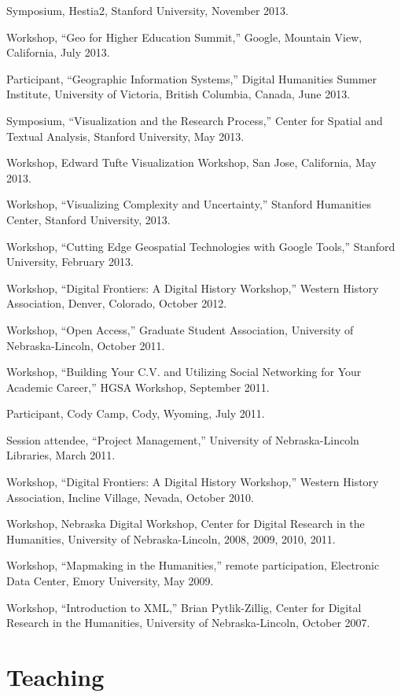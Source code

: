Symposium, Hestia2, Stanford University, November 2013.

Workshop, ``Geo for Higher Education Summit,'' Google, Mountain View,
California, July 2013.

Participant, ``Geographic Information Systems,'' Digital Humanities
Summer Institute, University of Victoria, British Columbia, Canada, June
2013.

Symposium, ``Visualization and the Research Process,'' Center for
Spatial and Textual Analysis, Stanford University, May 2013.

Workshop, Edward Tufte Visualization Workshop, San Jose, California, May
2013.

Workshop, ``Visualizing Complexity and Uncertainty,'' Stanford
Humanities Center, Stanford University, 2013.

Workshop, ``Cutting Edge Geospatial Technologies with Google Tools,''
Stanford University, February 2013.

Workshop, ``Digital Frontiers: A Digital History Workshop,'' Western
History Association, Denver, Colorado, October 2012.

Workshop, ``Open Access,'' Graduate Student Association, University of
Nebraska-Lincoln, October 2011.

Workshop, ``Building Your C.V. and Utilizing Social Networking for Your
Academic Career,'' HGSA Workshop, September 2011.

Participant, Cody Camp, Cody, Wyoming, July 2011.

Session attendee, ``Project Management,'' University of Nebraska-Lincoln
Libraries, March 2011.

Workshop, ``Digital Frontiers: A Digital History Workshop,'' Western
History Association, Incline Village, Nevada, October 2010.

Workshop, Nebraska Digital Workshop, Center for Digital Research in the
Humanities, University of Nebraska-Lincoln, 2008, 2009, 2010, 2011.

Workshop, ``Mapmaking in the Humanities,'' remote participation,
Electronic Data Center, Emory University, May 2009.

Workshop, ``Introduction to XML,'' Brian Pytlik-Zillig, Center for
Digital Research in the Humanities, University of Nebraska-Lincoln,
October 2007.

\section{Teaching}\label{teaching}

